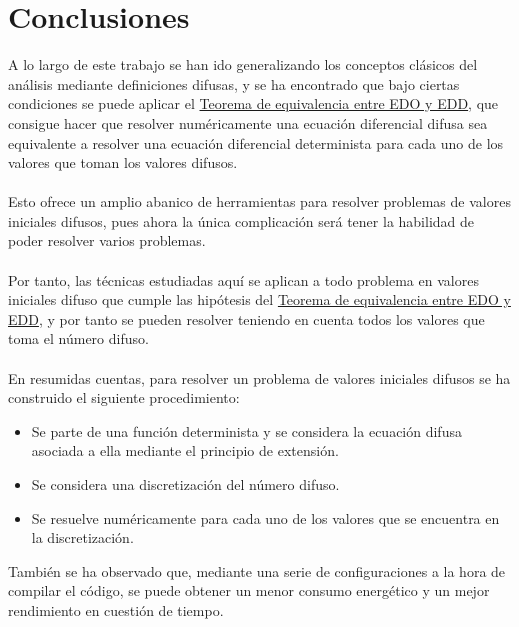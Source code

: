 \chapter{Conclusiones}
A lo largo de este trabajo se han ido generalizando los conceptos clásicos del análisis mediante definiciones difusas, y se ha encontrado que bajo ciertas condiciones se puede aplicar el \hyperref[teorema:equivalencia]{Teorema de equivalencia entre EDO y EDD}, que consigue hacer que resolver numéricamente una ecuación diferencial difusa sea equivalente a resolver una ecuación diferencial determinista para cada uno de los valores que toman los valores difusos. 
\\ \\
Esto ofrece un amplio abanico de herramientas para resolver problemas de valores iniciales difusos, pues ahora la única complicación será tener la habilidad de poder resolver varios problemas.
\\ \\
Por tanto, las técnicas estudiadas aquí se aplican a todo problema en valores iniciales difuso que cumple las hipótesis del \hyperref[teorema:equivalencia]{Teorema de equivalencia entre EDO y EDD}, y por tanto se pueden resolver teniendo en cuenta todos los valores que toma el número difuso.
\\ \\
En resumidas cuentas, para resolver un problema de valores iniciales difusos se ha construido el siguiente procedimiento:
\begin{itemize}
	\item Se parte de una función determinista y se considera la ecuación difusa asociada a ella mediante el principio de extensión.
	
	\item Se considera una discretización del número difuso.
	
	\item Se resuelve numéricamente para cada uno de los valores que se encuentra en la discretización.
\end{itemize}
También se ha observado que, mediante una serie de configuraciones a la hora de compilar el código, se puede obtener un menor consumo energético y un mejor rendimiento en cuestión de tiempo.

